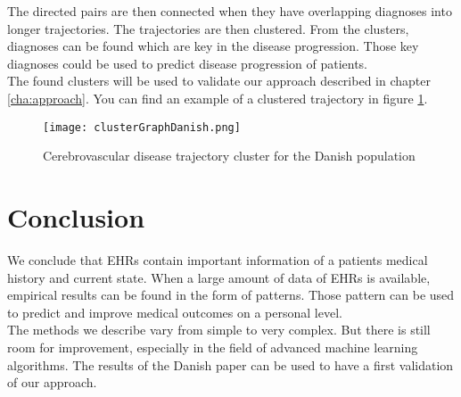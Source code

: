 The directed pairs are then connected when they have overlapping diagnoses into longer trajectories. The trajectories are then clustered. From the clusters, diagnoses can be found which are key in the disease progression. Those key diagnoses could be used to predict disease progression of patients. \\

The found clusters will be used to validate our approach described in chapter \ref{cha:approach}. You can find an example of a clustered trajectory in figure \ref{fig:clusterGraphDanish}.

\begin{figure}[H]
	\centering
	\texttt{[image: clusterGraphDanish.png]}
	\caption{Cerebrovascular disease trajectory cluster for the Danish population \cite{Brunak:article}}
	\label{fig:clusterGraphDanish}
\end{figure}


\section{Conclusion}

We conclude that EHRs contain important information of a patients medical history and current state. When a large amount of data of EHRs is available, empirical results can be found in the form of patterns. Those pattern can be used to predict and improve medical outcomes on a personal level. \\
The methods we describe vary from simple to very complex. But there is still room for improvement, especially in the field of advanced machine learning algorithms. The results of the Danish paper can be used to have a first validation of our approach.


